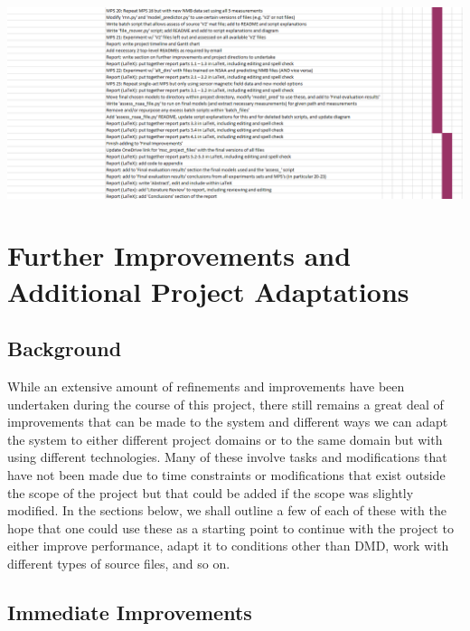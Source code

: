 \documentclass[12pt,twoside]{report}
\begin{document}
\begin{center}
\includegraphics[scale=0.4]{project_figures/fig12_9}
\end{center}




\chapter{Further Improvements and Additional Project Adaptations\\}

\section{Background}

\quad While an extensive amount of refinements and improvements have been undertaken during the course of this project, there still remains a great deal of improvements that can be made to the system and different ways we can adapt the system to either different project domains or to the same domain but with using different technologies. Many of these involve tasks and modifications that have not been made due to time constraints or modifications that exist outside the scope of the project but that could be added if the scope was slightly modified. In the sections below, we shall outline a few of each of these with the hope that one could use these as a starting point to continue with the project to either improve performance, adapt it to conditions other than DMD, work with different types of source files, and so on.

\section{Immediate Improvements}

\end{document}
